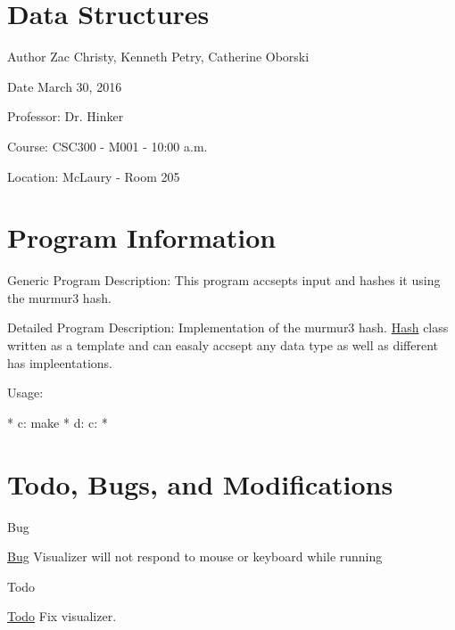 \hypertarget{index_CSC300}{}\section{Data Structures}\label{index_CSC300}
\begin{DoxyAuthor}{Author}
Zac Christy, Kenneth Petry, Catherine Oborski
\end{DoxyAuthor}
\begin{DoxyDate}{Date}
March 30, 2016
\end{DoxyDate}
\begin{DoxyParagraph}{Professor\+: }
Dr. Hinker
\end{DoxyParagraph}
\begin{DoxyParagraph}{Course\+: }
C\+S\+C300 -\/ M001 -\/ 10\+:00 a.\+m.
\end{DoxyParagraph}
\begin{DoxyParagraph}{Location\+: }
Mc\+Laury -\/ Room 205
\end{DoxyParagraph}
\hypertarget{index_program_section}{}\section{Program Information}\label{index_program_section}
Generic Program Description\+: This program accsepts input and hashes it using the murmur3 hash.

Detailed Program Description\+: Implementation of the murmur3 hash. \hyperlink{classHash}{Hash} class written as a template and can easaly accsept any data type as well as different has impleentations.

\begin{DoxyParagraph}{Usage\+: }
\begin{DoxyVerb}* c:\> make 
* d:\> c:\bin\make
* \end{DoxyVerb}

\end{DoxyParagraph}
\hypertarget{index_todo_bugs_modification_section}{}\section{Todo, Bugs, and Modifications}\label{index_todo_bugs_modification_section}
\begin{DoxyRefDesc}{Bug}
\item[\hyperlink{bug__bug000001}{Bug}]Visualizer will not respond to mouse or keyboard while running\end{DoxyRefDesc}


\begin{DoxyRefDesc}{Todo}
\item[\hyperlink{todo__todo000001}{Todo}]Fix visualizer.\end{DoxyRefDesc}


